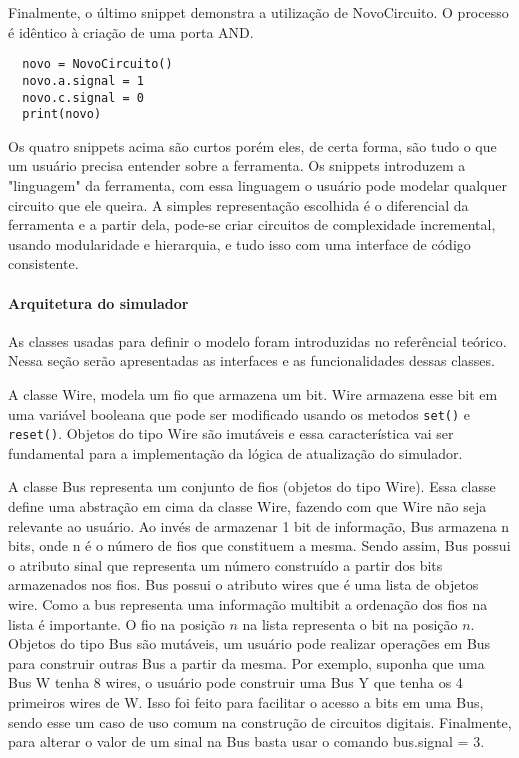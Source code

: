 Finalmente, o último snippet demonstra a utilização de NovoCircuito.
O processo é idêntico à criação de uma porta AND.

\begin{lstlisting}
  novo = NovoCircuito()
  novo.a.signal = 1
  novo.c.signal = 0
  print(novo)
\end{lstlisting}

Os quatro snippets acima são curtos porém eles, de certa forma, são tudo o que um usuário precisa entender sobre a ferramenta.
Os snippets introduzem a "linguagem" da ferramenta, com essa linguagem o usuário pode modelar qualquer circuito que ele queira.
A simples representação escolhida é o diferencial da ferramenta e a partir dela, pode-se criar circuitos de complexidade incremental, usando modularidade e hierarquia, e tudo isso com uma interface de código consistente.

\paragraph{Arquitetura do simulador}
As classes usadas para definir o modelo foram introduzidas no referêncial teórico.
Nessa seção serão apresentadas as interfaces e as funcionalidades dessas classes.

A classe Wire, modela um fio que armazena um bit.
Wire armazena esse bit em uma variável booleana que pode ser modificado usando os metodos \texttt{set()} e \texttt{reset()}.
Objetos do tipo Wire são imutáveis e essa característica vai ser fundamental para a implementação da lógica de atualização do simulador.

A classe Bus representa um conjunto de fios (objetos do tipo Wire).
Essa classe define uma abstração em cima da classe Wire, fazendo com que Wire não seja relevante ao usuário.
Ao invés de armazenar 1 bit de informação, Bus armazena n bits, onde n é o número de fios que constituem a mesma.
Sendo assim, Bus possui o atributo sinal que representa um número construído a partir dos bits armazenados nos fios.
Bus possui o atributo wires que é uma lista de objetos wire.
Como a bus representa uma informação multibit a ordenação dos fios na lista é importante.
O fio na posição $n$ na lista representa o bit na posição $n$.
Objetos do tipo Bus são mutáveis, um usuário pode realizar operações em Bus para construir outras Bus a partir da mesma.
Por exemplo, suponha que uma Bus W tenha 8 wires, o usuário pode construir uma Bus Y que tenha os 4 primeiros wires de W.
Isso foi feito para facilitar o acesso a bits em uma Bus, sendo esse um caso de uso comum na construção de circuitos digitais.
Finalmente, para alterar o valor de um sinal na Bus basta usar o comando bus.signal = 3.


